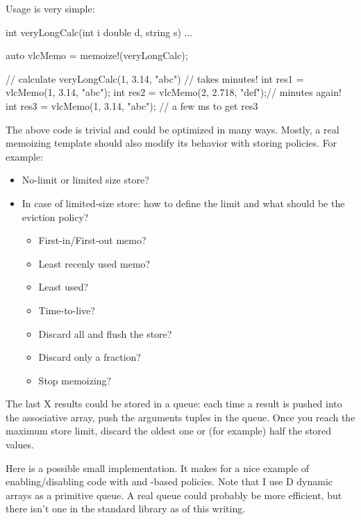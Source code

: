 Usage is very simple:

\begin{dcode}
int veryLongCalc(int i double d, string s) { ... }

auto vlcMemo = memoize!(veryLongCalc);

// calculate veryLongCalc(1, 3.14, "abc")
// takes minutes!
int res1 = vlcMemo(1, 3.14, "abc"); 
int res2 = vlcMemo(2, 2.718, "def");// minutes again!
int res3 = vlcMemo(1, 3.14, "abc"); // a few ms to get res3
\end{dcode}

The above code is trivial and could be optimized in many ways. Mostly, a real memoizing template should also modify its behavior with storing policies. For example:

\begin{itemize}
\item No-limit or limited size store? 
\item In case of limited-size store: how to define the limit and what should be the eviction policy?
\begin{itemize}
\item First-in/First-out memo?
\item Least recenly used memo?
\item Least used?
\item Time-to-live?
\item Discard all and flush the store?
\item Discard only a fraction?
\item Stop memoizing?
\end{itemize}
\end{itemize}

The last X results could be stored in a queue: each time a result is pushed into the associative array, push the arguments tuples in the queue. Once you reach the maximum store limit, discard the oldest one or (for example) half the stored values.

Here is a possible small implementation. It makes for a nice example of enabling/disabling code with  and -based policies. Note that I use D dynamic arrays as a primitive queue. A real queue could probably be more efficient, but there isn't one in the standard library as of this writing.

